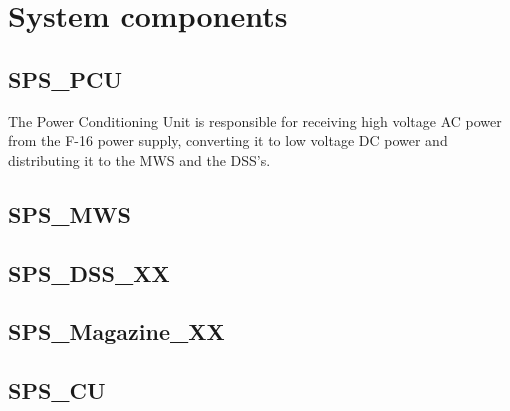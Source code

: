 \documentclass[Main]{subfiles}
\begin{document}
\section{System components}

\subsection{SPS\_PCU}
The Power Conditioning Unit is responsible for receiving high voltage AC power from the F-16 power supply, converting it to low voltage DC power and distributing it to the MWS and the DSS's.

\subsection{SPS\_MWS}

\subsection{SPS\_DSS\_XX}

\subsection{SPS\_Magazine\_XX}

\subsection{SPS\_CU}
\end{document}
